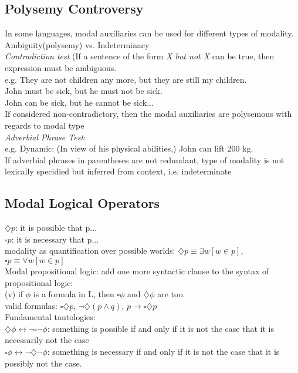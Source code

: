 \subsection*{Polysemy Controversy}
In some languages, modal auxiliaries can be used for different types of modality.\\
Ambiguity(polysemy) vs. Indeterminacy\\
\emph{Contradiction test} (If a sentence of the form \emph{X but not X} can be true, then expression must be ambiguous.\\
e.g. They are not children any more, but they are still my
children. \\
John must be sick, but he must not be sick.\\
John can be sick, but he cannot be sick...\\
If considered non-contradictory, then the modal auxiliaries are polysemous with regards to modal type\\
\emph{Adverbial Phrase Test}: \\
e.g. Dynamic: (In view of his physical abilities,) John can lift 200 kg.\\
If adverbial phrases in parentheses are not redundant, type of modality is not lexically specidied but inferred from context, i.e. indeterminate
\subsection*{Modal Logical Operators}
$\diamondsuit p$: it is possible that p...\\
$\square p$: it is necessary that p...\\
modality as quantification over possible worlds: $\diamondsuit p \equiv \exists w[w \in p]$, $\square p \equiv \forall w[w \in p]$\\
Modal propositional logic: add one more syntactic clause to the syntax of propositional logic: \\
(v) if $\phi$ is a formula in L, then $\square \phi$ and $\diamondsuit \phi$ are too.\\
valid formulas: $\square \diamondsuit p$, $\neg \diamondsuit (p \land q)$, $p \to \square \diamondsuit p$\\
Fundamental tautologies:\\
$\diamondsuit \phi \leftrightarrow \neg \square \neg \phi$: something is possible if and only if it is
not the case that it is necessarily not the case\\
$\square \phi \leftrightarrow \neg \diamondsuit \neg \phi$: something is necessary if and only if it is not the case that it is possibly not the case.\\
